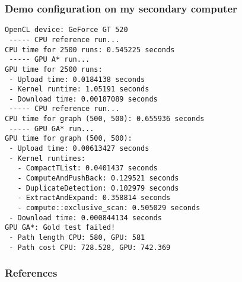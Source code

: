 \documentclass{beamer}
\begin{document}
\begin{frame}[fragile]
    \frametitle{Demo configuration on my secondary computer}
    \scriptsize
    \begin{verbatim}
OpenCL device: GeForce GT 520
 ----- CPU reference run...
CPU time for 2500 runs: 0.545225 seconds
 ----- GPU A* run...
GPU time for 2500 runs:
 - Upload time: 0.0184138 seconds
 - Kernel runtime: 1.05191 seconds
 - Download time: 0.00187089 seconds
 ----- CPU reference run...
CPU time for graph (500, 500): 0.655936 seconds
 ----- GPU GA* run...
GPU time for graph (500, 500):
 - Upload time: 0.00613427 seconds
 - Kernel runtimes: 
   - CompactTList: 0.0401437 seconds
   - ComputeAndPushBack: 0.129521 seconds
   - DuplicateDetection: 0.102979 seconds
   - ExtractAndExpand: 0.358814 seconds
   - compute::exclusive_scan: 0.505029 seconds
 - Download time: 0.000844134 seconds
GPU GA*: Gold test failed!
 - Path length CPU: 580, GPU: 581
 - Path cost CPU: 728.528, GPU: 742.369
    \end{verbatim}
\end{frame}

\begin{frame}
    \frametitle{References}
\end{frame}
\end{document}
